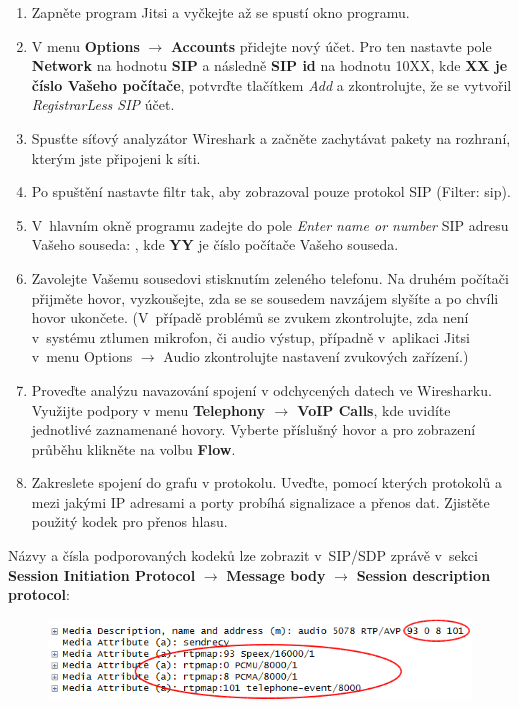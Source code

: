 \begin{enumerate}
    \item Zapněte program Jitsi a vyčkejte až se spustí okno programu.
    \item V menu {\bf Options} $\rightarrow$ {\bf Accounts} přidejte nový účet. Pro ten nastavte pole {\bf Network} na hodnotu {\bf SIP} a následně {\bf SIP id} na hodnotu 10XX, kde {\bf XX je číslo Vašeho počítače}, potvrďte tlačítkem {\it Add} a zkontrolujte, že se vytvořil {\it RegistrarLess SIP} účet.
    \item Spusťte síťový analyzátor Wireshark a začněte zachytávat pakety na rozhraní, kterým jste připojeni k síti.
    \item Po spuštění nastavte filtr tak, aby zobrazoval pouze protokol SIP (Filter: sip).
    \item V hlavním okně programu zadejte do pole {\it Enter name or number} SIP adresu Vašeho souseda: , kde {\bf YY} je číslo počítače Vašeho souseda.
    \item Zavolejte Vašemu sousedovi stisknutím zeleného telefonu. Na druhém počítači přijměte hovor, vyzkoušejte, zda se se sousedem navzájem slyšíte a po chvíli hovor ukončete.
(V případě problémů se zvukem zkontrolujte, zda není v systému ztlumen mikrofon, či audio výstup, případně v aplikaci Jitsi v menu Options $\rightarrow$ Audio zkontrolujte nastavení zvukových zařízení.) 
    \item Proveďte analýzu navazování spojení v odchycených datech ve Wiresharku. Využijte podpory v menu {\bf Telephony $\rightarrow$ VoIP Calls}, kde uvidíte jednotlivé zaznamenané hovory. Vyberte příslušný hovor a pro zobrazení průběhu klikněte na volbu {\bf Flow}.
    \item Zakreslete spojení do grafu v protokolu. Uveďte, pomocí kterých protokolů a mezi jakými IP adresami a porty probíhá signalizace a přenos dat. Zjistěte použitý kodek pro přenos hlasu.
\end{enumerate}
Názvy a čísla podporovaných kodeků lze zobrazit v SIP/SDP zprávě v sekci {\bf Session Initiation Protocol} $\rightarrow$ {\bf Message body} $\rightarrow$ {\bf Session description protocol}:
\begin{figure}[h!]
  \centering
  \includegraphics[width=145mm]{img/3a.png}
\end{figure}


